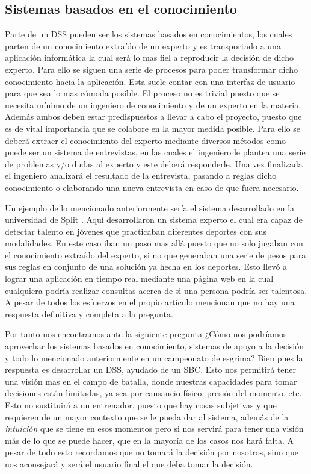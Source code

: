 \subsection{Sistemas basados en el conocimiento}

Parte de un \acs{DSS} pueden ser los sistemas basados en conocimientos, los cuales parten de un conocimiento extraído de un
 experto y es transportado a una aplicación informática la cual será lo mas fiel a reproducir
 la decisión de dicho experto. Para ello se siguen una serie de procesos para poder transformar
 dicho conocimiento hacia la aplicación. Esta suele contar con una interfaz de usuario para que
 sea lo mas cómoda posible. El proceso no es trivial puesto que se necesita mínimo
 de un ingeniero de conocimiento y de un experto en la materia. Además ambos deben estar predispuestos
 a llevar a cabo el proyecto, puesto que es de vital importancia que se colabore en la mayor
 medida posible. Para ello se deberá extraer el conocimiento del experto mediante diversos métodos
 como puede ser un sistema de entrevistas, en las cuales el ingeniero le plantea una serie
 de problemas y/o dudas al experto y este deberá responderle. Una vez finalizada el ingeniero
 analizará el resultado de la entrevista, pasando a reglas dicho conocimiento o elaborando
 una nueva entrevista en caso de que fuera necesario.

Un ejemplo de lo mencionado anteriormente sería el sistema desarrollado en la universidad de Split \cite{sportTalent}.
 Aquí desarrollaron un sistema experto el cual era capaz de detectar talento en jóvenes que
 practicaban diferentes deportes con sus modalidades. En este caso iban un paso mas allá puesto
 que no solo jugaban con el conocimiento extraído del experto, si no que generaban una serie de
 pesos para sus reglas en conjunto de una solución ya hecha en los deportes. Esto llevó a lograr
 una aplicación en tiempo real mediante una página web en la cual cualquiera podría realizar consultas
 acerca de si una persona podría ser talentosa. A pesar de todos los esfuerzos en el propio artículo
 mencionan que no hay una respuesta definitiva y completa a la pregunta.

Por tanto nos encontramos ante la siguiente pregunta ¿Cómo nos podríamos aprovechar los
 sistemas basados en conocimiento, sistemas de apoyo a la decisión y todo lo mencionado
 anteriormente en un campeonato de esgrima? Bien pues la respuesta es desarrollar un \acs{DSS}, ayudado de un \acs{SBC}. Esto nos permitirá tener una
 visión mas en el campo de batalla, donde
 nuestras capacidades para tomar decisiones están limitadas, ya sea por cansancio físico, presión del
 momento, etc. Esto no sustituirá a un entrenador, puesto que hay cosas subjetivas y que requieren
 de un mayor contexto que se le pueda dar al sistema, además de la \textit{intuición} que se tiene en esos momentos
 pero si nos servirá para tener una visión más de lo que se puede hacer, que en la mayoría de los
 casos nos hará falta. A pesar de todo esto recordamos que no tomará la decisión por nosotros,
 sino que nos aconsejará y será el usuario final el que deba tomar la decisión.

